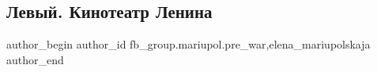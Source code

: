  
 
 
 
 

\subsection{Левый. Кинотеатр Ленина}
\label{sec:27_01_2023.fb.fb_group.mariupol.pre_war.2.levii__kinoteatr_len}
 
\ifcmt
 author_begin
   author_id fb_group.mariupol.pre_war,elena_mariupolskaja
 author_end
\fi
